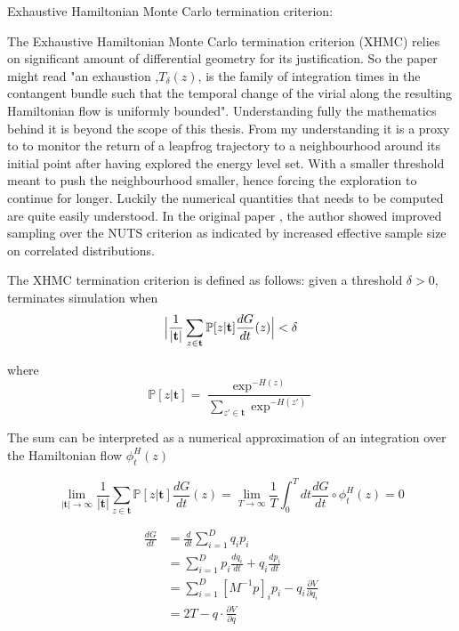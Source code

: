 \documentclass[]{report}
\begin{document}
Exhaustive Hamiltonian Monte Carlo termination criterion:

The Exhaustive Hamiltonian Monte Carlo termination criterion (XHMC) relies on significant amount of differential geometry for its justification. So the paper might read "an exhaustion ,$T_{\delta}(z)$, is the family of integration times in the contangent bundle such that the temporal change of the virial along the resulting Hamiltonian flow is uniformly bounded". Understanding fully the mathematics behind it is beyond the scope of this thesis. From my understanding it is a proxy to to monitor the return of a leapfrog trajectory to a neighbourhood around its initial point after having explored the energy level set. With a smaller threshold meant to push the neighbourhood smaller, hence forcing the exploration to continue for longer. Luckily the numerical quantities that needs to be computed are quite easily understood. In the original paper \cite{betancourt2016identifying}, the author showed improved sampling over the NUTS criterion as indicated by increased effective sample size on correlated distributions. 

The XHMC termination criterion is defined as follows: given a threshold $\delta > 0$, terminates simulation when 
\[  \Bigl |\frac{1}{|\mathbf{t}|} \sum_{z \in \mathbf{t}} \mathbb{P}[z | \mathbf{t}] \frac{dG}{dt}(z) \Bigr | < \delta \]

where 
\[ \mathbb{P}[z| \mathbf{t}] = \frac{\exp^{-H(z)}}{\sum_{z' \in \mathbf{t}} \exp^{-H(z')}} \]

The sum can be interpreted as a numerical approximation of an integration over the Hamiltonian flow $\phi_{t}^H(z)$

\[ \lim_{|\mathbf{t}| \rightarrow \infty} \frac{1}{|\mathbf{t}|} \sum_{z \in \mathbf{t}} \mathbb{P}[z | \mathbf{t}] \frac{dG}{dt}(z)  = \lim_{T \rightarrow \infty} \frac{1}{T} \int_0^T dt \frac{dG}{dt} \circ \phi_{t}^H(z) = 0 \]

\begin{align*}
 \frac{dG}{dt} &= \frac{d}{dt}\sum_{i=1}^D q_i p_i \\
 &= \sum_{i=1}^D p_i \frac{dq_i}{dt} + q_i \frac{dp_i}{dt} \\
 &= \sum_{i=1}^D [M^{-1}p]_i p_i - q_i \frac{\partial V}{\partial q_i} \\
 &= 2 T - q \cdot \frac{\partial V}{\partial q} \\
\end{align*}
\end{document}
